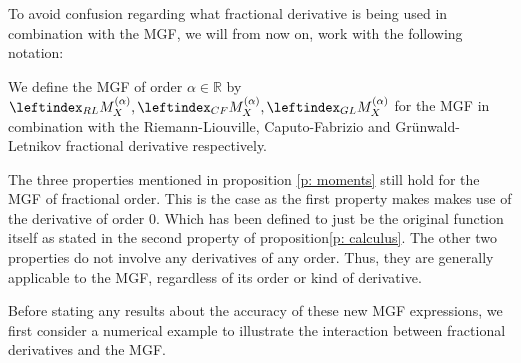 To avoid confusion regarding what fractional derivative is being used in combination with the MGF, we will from now on, work with the following notation:
\begin{definition}\label{d: MGF}
    We define the MGF of order \(\alpha \in \mathbb{R}\) by \(\leftindex_{RL}{M}_X^{(\alpha)}, \leftindex_{CF}{M}_X^{(\alpha)}, \leftindex_{GL}{M}_X^{(\alpha)}\) for the MGF in combination with the Riemann-Liouville, Caputo-Fabrizio and Grünwald-Letnikov fractional derivative respectively.
\end{definition}
\begin{remark}
    The three properties mentioned in proposition \ref{p: moments} still hold for the MGF of fractional order. This is the case as the first property makes makes use of the derivative of order 0. Which has been defined to just be the original function itself as stated in the second property of proposition\ref{p: calculus}. The other two properties do not involve any derivatives of any order. Thus, they are generally applicable to the MGF, regardless of its order or kind of derivative.
\end{remark}

Before stating any results about the accuracy of these new MGF expressions, we first consider a numerical example to illustrate the interaction between fractional derivatives and the MGF. 


